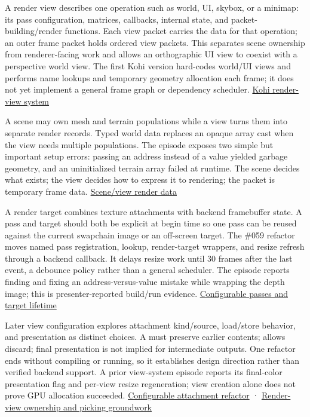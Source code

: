 \hypertarget{06-engine-ii-ch026-let-render-views-assemble-frame-specific-work}{}

A render view describes one operation such as world, UI, skybox, or a minimap: its pass configuration, matrices, callbacks, internal state, and packet-building/render functions. Each view packet carries the data for that operation; an outer frame packet holds ordered view packets. This separates scene ownership from renderer-facing work and allows an orthographic UI view to coexist with a perspective world view. The first Kohi version hard-codes world/UI views and performs name lookups and temporary geometry allocation each frame; it does not yet implement a general frame graph or dependency scheduler. \href{https://www.youtube.com/watch?v=f8fx0HB6GgY}{Kohi render-view system}

A scene may own mesh and terrain populations while a view turns them into separate render records. Typed world data replaces an opaque array cast when the view needs multiple populations. The episode exposes two simple but important setup errors: passing an address instead of a value yielded garbage geometry, and an uninitialized terrain array failed at runtime. The scene decides what exists; the view decides how to express it to rendering; the packet is temporary frame data. \href{https://www.youtube.com/watch?v=JgMCoxs0nqo}{Scene/view render data}

A render target combines texture attachments with backend framebuffer state. A pass and target should both be explicit at begin time so one pass can be reused against the current swapchain image or an off-screen target. The \#059 refactor moves named pass registration, lookup, render-target wrappers, and resize refresh through a backend callback. It delays resize work until 30 frames after the last event, a debounce policy rather than a general scheduler. The episode reports finding and fixing an address-versus-value mistake while wrapping the depth image; this is presenter-reported build/run evidence. \href{https://www.youtube.com/watch?v=tZjc_hSaUA4}{Configurable passes and target lifetime}

Later view configuration explores attachment kind/source, load/store behavior, and presentation as distinct choices. A  must preserve earlier contents;  allows discard; final presentation is not implied for intermediate outputs. One refactor ends without compiling or running, so it establishes design direction rather than verified backend support. A prior view-system episode reports its final-color presentation flag and per-view resize regeneration; view creation alone does not prove GPU allocation succeeded. \href{https://www.youtube.com/watch?v=wjiCBUXFVow}{Configurable attachment refactor} · \href{https://www.youtube.com/watch?v=akxXEfbZcrk}{Render-view ownership and picking groundwork}

